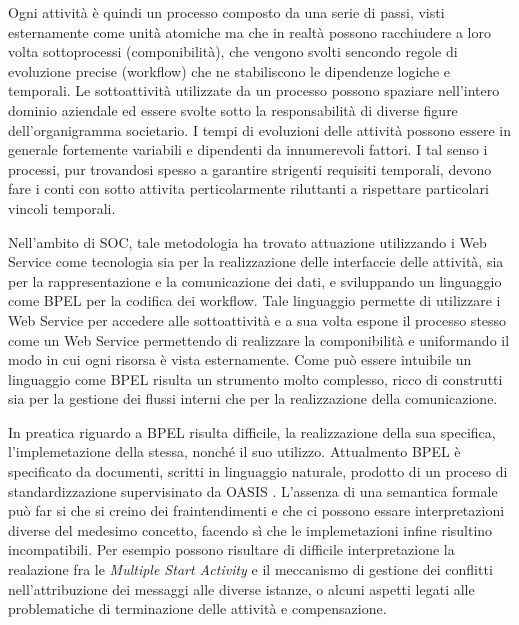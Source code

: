 Ogni attività è quindi un processo composto da una serie di passi, visti
esternamente come unità atomiche ma che in realtà possono racchiudere a loro
volta sottoprocessi (componibilità), che vengono svolti sencondo regole di
evoluzione precise (workflow) che ne stabiliscono le dipendenze logiche e
temporali. Le sottoattività utilizzate da un processo possono spaziare
nell'intero dominio aziendale ed essere svolte sotto la responsabilità di diverse
figure dell'organigramma societario. I tempi di evoluzioni delle attività possono
essere in generale fortemente variabili e dipendenti da innumerevoli fattori. I
tal senso i processi, pur trovandosi spesso a garantire strigenti requisiti
temporali, devono fare i conti con sotto attivita perticolarmente riluttanti a
rispettare particolari vincoli temporali.

Nell'ambito di SOC, tale metodologia ha trovato attuazione utilizzando i Web
Service come tecnologia sia per la realizzazione delle interfaccie delle
attività, sia per la rappresentazione e la comunicazione dei dati, e
sviluppando un linguaggio come BPEL \cite{BPEL11Spec} per la codifica dei workflow.
Tale linguaggio permette di utilizzare i Web Service per accedere alle
sottoattività e a sua volta espone il processo stesso come un Web Service
permettendo di realizzare la componibilità e uniformando il modo in cui ogni
risorsa è vista esternamente. Come può essere intuibile un linguaggio come BPEL
risulta un strumento molto complesso, ricco di construtti sia per la gestione dei
flussi interni che per la realizzazione della comunicazione.

In preatica riguardo a BPEL risulta difficile, la realizzazione della sua
specifica, l'implemetazione della stessa, nonché il suo utilizzo. Attualmento BPEL è
specificato da documenti, scritti in linguaggio naturale, prodotto di un proceso
di standardizzazione supervisinato da OASIS \cite{OASISSite}. L'assenza di una
semantica formale può far si che si creino dei fraintendimenti e che ci possono
essare interpretazioni diverse del medesimo concetto, facendo sì che le
implemetazioni infine risultino incompatibili. Per esempio possono risultare di
difficile interpretazione la realazione fra le \emph{Multiple Start Activity} e
il meccanismo di gestione dei conflitti nell'attribuzione dei messaggi alle
diverse istanze, o alcuni aspetti legati alle problematiche di terminazione
delle attività e compensazione.

